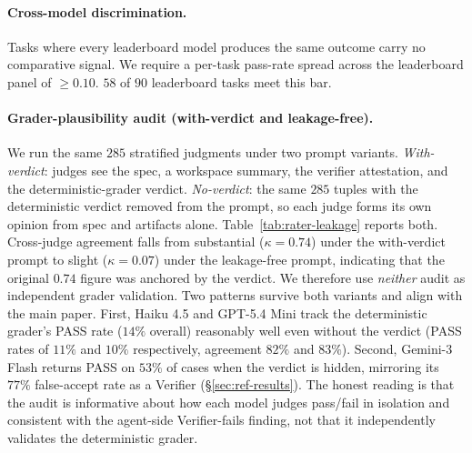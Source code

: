 \documentclass{article}
\begin{document}
\paragraph{Cross-model discrimination.} Tasks where every leaderboard model produces the same outcome carry no comparative signal. We require a per-task pass-rate spread across the leaderboard panel of $\geq 0.10$. $58$ of $90$ leaderboard tasks meet this bar.

\paragraph{Grader-plausibility audit (with-verdict and leakage-free).} We run the same $285$ stratified judgments under two prompt variants. \emph{With-verdict}: judges see the spec, a workspace summary, the verifier attestation, and the deterministic-grader verdict. \emph{No-verdict}: the same $285$ tuples with the deterministic verdict removed from the prompt, so each judge forms its own opinion from spec and artifacts alone. Table~\ref{tab:rater-leakage} reports both. Cross-judge agreement falls from substantial ($\kappa = 0.74$) under the with-verdict prompt to slight ($\kappa = 0.07$) under the leakage-free prompt, indicating that the original $0.74$ figure was anchored by the verdict. We therefore use \emph{neither} audit as independent grader validation. Two patterns survive both variants and align with the main paper. First, Haiku 4.5 and GPT-5.4 Mini track the deterministic grader's PASS rate ($14\%$ overall) reasonably well even without the verdict (PASS rates of $11\%$ and $10\%$ respectively, agreement $82\%$ and $83\%$). Second, Gemini-3 Flash returns PASS on $53\%$ of cases when the verdict is hidden, mirroring its $77\%$ false-accept rate as a Verifier (\S\ref{sec:ref-results}). The honest reading is that the audit is informative about how each model judges pass/fail in isolation and consistent with the agent-side Verifier-fails finding, not that it independently validates the deterministic grader.
\end{document}
